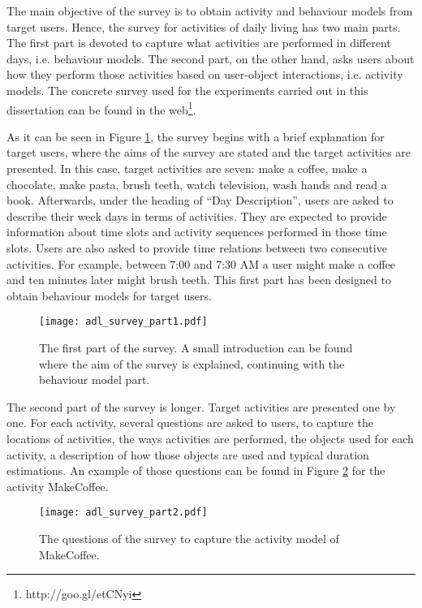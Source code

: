 The main objective of the survey is to obtain activity and behaviour models from target users. Hence, the survey for activities of daily living has two main parts. The first part is devoted to capture what activities are performed in different days, i.e. behaviour models. The second part, on the other hand, asks users about how they perform those activities based on user-object interactions, i.e. activity models. The concrete survey used for the experiments carried out in this dissertation can be found in the web\footnote{http://goo.gl/etCNyi}. 

As it can be seen in Figure \ref{fig-survey-1}, the survey begins with a brief explanation for target users, where the aims of the survey are stated and the target activities are presented. In this case, target activities are seven: make a coffee, make a chocolate, make pasta, brush teeth, watch television, wash hands and read a book. Afterwards, under the heading of ``Day Description'', users are asked to describe their week days in terms of activities. They are expected to provide information about time slots and activity sequences performed in those time slots. Users are also asked to provide time relations between two consecutive activities. For example, between 7:00 and 7:30 AM a user might make a coffee and ten minutes later might brush teeth. This first part has been designed to obtain behaviour models for target users.

\begin{figure}[htbp]
\centering
\texttt{[image: adl\_survey\_part1.pdf]}
    \caption{The first part of the survey. A small introduction can be found where the aim of the survey is explained, continuing with the behaviour model part.}
    \label{fig-survey-1}
\end{figure}

The second part of the survey is longer. Target activities are presented one by one. For each activity, several questions are asked to users, to capture the locations of activities, the ways activities are performed, the objects used for each activity, a description of how those objects are used and typical duration estimations. An example of those questions can be found in Figure \ref{fig-survey-2} for the activity MakeCoffee.

\begin{figure}[htbp]
\centering
\texttt{[image: adl\_survey\_part2.pdf]}
    \caption{The questions of the survey to capture the activity model of MakeCoffee.}
    \label{fig-survey-2}
\end{figure}

